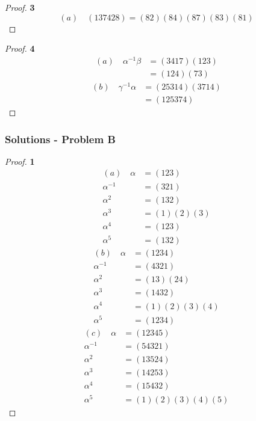 \documentclass[11pt]{article}
\begin{document}
		\begin{proof}{\textbf{3}}
			$$(a) \quad (137428) = (82)(84)(87)(83)(81)$$
		\end{proof}
		\begin{proof}{\textbf{4}}
			\begin{align*}
			(a) \quad \alpha^{-1}\beta &= (3417)(123) \\
									   &= (124)(73)							  
			\end{align*}
			\begin{align*}
			(b) \quad \gamma^{-1}\alpha &= (25314)(3714) \\
									    &= (125374)
			\end{align*}
		\end{proof}

	\subsubsection*{Solutions - Problem B}
		\begin{proof}{\textbf{1}}
			\begin{align*}
				(a) \quad \alpha &= (123) \\
				\alpha^{-1} &= (321) \\
				\alpha^{2} &= (132) \\
				\alpha^{3} &= (1)(2)(3) \\
				\alpha^{4} &= (123) \\
				\alpha^{5} &= (132)
			\end{align*}
			\begin{align*}
				(b) \quad \alpha &= (1234) \\
				\alpha^{-1} &= (4321) \\
				\alpha^{2} &= (13)(24) \\
				\alpha^{3} &= (1432) \\
				\alpha^{4} &= (1)(2)(3)(4) \\
				\alpha^{5} &= (1234)
			\end{align*}
			\begin{align*}
				(c) \quad \alpha &= (12345) \\
				\alpha^{-1} &= (54321) \\
				\alpha^{2} &= (13524) \\
				\alpha^{3} &= (14253) \\
				\alpha^{4} &= (15432) \\
				\alpha^{5} &= (1)(2)(3)(4)(5)
			\end{align*}
		\end{proof}
\end{document}
